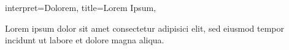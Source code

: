 \begin{song}{
interpret={Dolorem},
title={Lorem Ipsum},
}
\begin{chorus}
Lorem ipsum \leftrepeat\space\nolinebreak {}dolor sit amet \nolinebreak\rightrepeat\space \versebreak
{}consectetur adipisici elit, \versebreak
{}sed eiusmod tempor incidunt \versebreak
{}ut labore et dolore magna aliqua.
\end{chorus}

\end{song}
